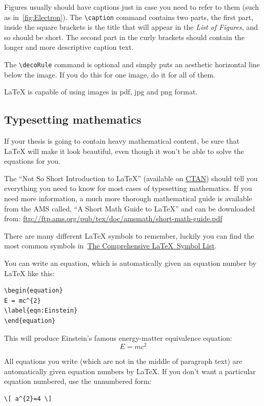 Figures usually should have captions just in case you need to refer to them (such as in~\autoref{fig:Electron}). The \verb|\caption| command contains two parts, the first part, inside the square brackets is the title that will appear in the \emph{List of Figures}, and so should be short. The second part in the curly brackets should contain the longer and more descriptive caption text.

The \verb|\decoRule| command is optional and simply puts an aesthetic horizontal line below the image. If you do this for one image, do it for all of them.

\LaTeX{} is capable of using images in pdf, jpg and png format.

\subsection{Typesetting mathematics}

If your thesis is going to contain heavy mathematical content, be sure that \LaTeX{} will make it look beautiful, even though it won't be able to solve the equations for you.

The \enquote{Not So Short Introduction to \LaTeX} (available on \href{http://www.ctan.org/tex-archive/info/lshort/english/lshort.pdf}{CTAN}) should tell you everything you need to know for most cases of typesetting mathematics. If you need more information, a much more thorough mathematical guide is available from the AMS called, \enquote{A Short Math Guide to \LaTeX} and can be downloaded from:
\url{ftp://ftp.ams.org/pub/tex/doc/amsmath/short-math-guide.pdf}

There are many different \LaTeX{} symbols to remember, luckily you can find the most common symbols in~\href{http://ctan.org/pkg/comprehensive}{The Comprehensive \LaTeX~Symbol List}.

You can write an equation, which is automatically given an equation number by \LaTeX{} like this:
\begin{verbatim}
\begin{equation}
E = mc^{2}
\label{eqn:Einstein}
\end{equation}
\end{verbatim}

This will produce Einstein's famous energy-matter equivalence equation:
\begin{equation}
	E = mc^{2}
	\label{eqn:Einstein}
\end{equation}

All equations you write (which are not in the middle of paragraph text) are automatically given equation numbers by \LaTeX{}. If you don't want a particular equation numbered, use the unnumbered form:
\begin{verbatim}
\[ a^{2}=4 \]
\end{verbatim}

